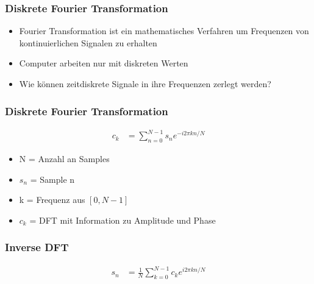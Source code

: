 \begin{frame}
	\frametitle{Diskrete Fourier Transformation}
	\begin{itemize}
		\item Fourier Transformation ist ein mathematisches Verfahren um Frequenzen von kontinuierlichen Signalen zu erhalten
		\item Computer arbeiten nur mit diskreten Werten
		\item Wie können zeitdiskrete Signale in ihre Frequenzen zerlegt werden?
	\end{itemize}
\end{frame}

\begin{frame}
	\frametitle{Diskrete Fourier Transformation}
	\begin{align*}
		c_k &= \sum_{n=0}^{N-1}s_n e^{-i2\pi k n / N}
	\end{align*}
	\begin{itemize}
		\item N = Anzahl an Samples
		\item $s_n$ = Sample n
		\item k = Frequenz aus $[0,N-1]$
		\item $c_k$ = DFT mit Information zu Amplitude und Phase
	\end{itemize}
\end{frame}

\begin{frame}
	\frametitle{Inverse DFT}
	\begin{align*}
		s_n &= \frac{1}{N} \sum_{k=0}^{N-1}c_k e^{i2\pi k n/N}
	\end{align*}
\end{frame}